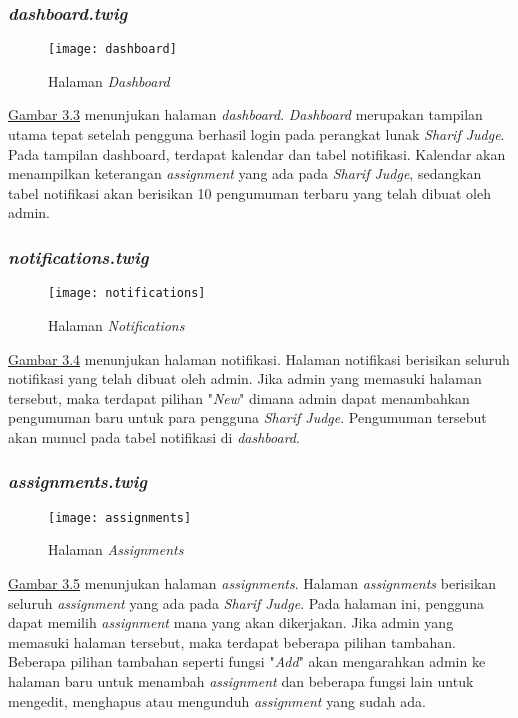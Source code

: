 \subsubsection{\textit{dashboard.twig}}
\begin{figure}[H]
	\centering  
	\texttt{[image: dashboard]}  
	\caption[Halaman \textit{Dashboard}]{Halaman \textit{Dashboard}} 
	\label{fig:dashboard} 
\end{figure} 
\hyperref[fig:dashboard]{Gambar 3.3} menunjukan halaman \textit{dashboard}. \textit{Dashboard} merupakan tampilan utama tepat setelah pengguna berhasil login pada perangkat lunak \textit{Sharif Judge}. Pada tampilan dashboard, terdapat kalendar dan tabel notifikasi. Kalendar akan menampilkan keterangan \textit{assignment} yang ada pada \textit{Sharif Judge}, sedangkan tabel notifikasi akan berisikan 10 pengumuman terbaru yang telah dibuat oleh admin.

\subsubsection{\textit{notifications.twig}}
\begin{figure}[H]
	\centering  
	\texttt{[image: notifications]}  
	\caption[Halaman \textit{Notifications}]{Halaman \textit{Notifications}} 
	\label{fig:notifications} 
\end{figure} 
\hyperref[fig:notifications]{Gambar 3.4} menunjukan halaman notifikasi. Halaman notifikasi berisikan seluruh notifikasi yang telah dibuat oleh admin. Jika admin yang memasuki halaman tersebut, maka terdapat pilihan "\textit{New}" dimana admin dapat menambahkan pengumuman baru untuk para pengguna \textit{Sharif Judge}. Pengumuman tersebut akan munucl pada tabel notifikasi di \textit{dashboard}.

\subsubsection{\textit{assignments.twig}}
\begin{figure}[H]
	\centering  
	\texttt{[image: assignments]}  
	\caption[Halaman \textit{Assignments}]{Halaman \textit{Assignments}} 
	\label{fig:assignments} 
\end{figure} 
\hyperref[fig:assignments]{Gambar 3.5} menunjukan halaman \textit{assignments}. Halaman \textit{assignments} berisikan seluruh \textit{assignment} yang ada pada \textit{Sharif Judge}. Pada halaman ini, pengguna dapat memilih \textit{assignment} mana yang akan dikerjakan. Jika admin yang memasuki halaman tersebut, maka terdapat beberapa pilihan tambahan. Beberapa pilihan tambahan seperti fungsi "\textit{Add}" akan mengarahkan admin ke halaman baru untuk menambah \textit{assignment} dan beberapa fungsi lain untuk mengedit, menghapus atau mengunduh \textit{assignment} yang sudah ada.

